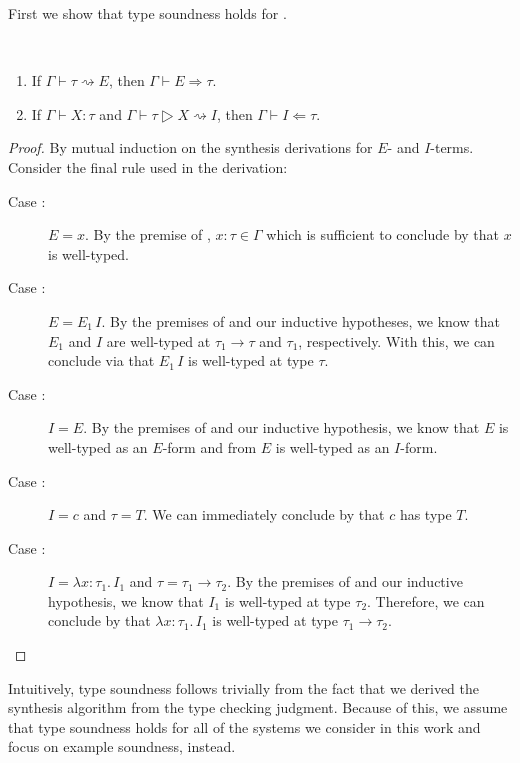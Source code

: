 First we show that type soundness holds for \lsyn{}.
\begin{proofenv}
  \begin{lemma}\ %
    \begin{enumerate}
      \item If $Γ ⊢ τ ⇝ E$, then $Γ ⊢ E ⇒ τ$.
      \item If $Γ ⊢ Χ : τ$ and $Γ ⊢ τ ▷ Χ ⇝ I$, then $Γ ⊢ I ⇐ τ$.
    \end{enumerate}
  \end{lemma}
  \begin{proof}
    By mutual induction on the synthesis derivations for $E$- and $I$-terms.
    Consider the final rule used in the derivation:
    \begin{description}
      \item[Case :]
        $E = x$.
        By the premise of , $x{:}τ ∈ Γ$ which is sufficient to conclude by  that $x$ is well-typed.
      \item[Case :]
        $E = E_1\,I$.
        By the premises of  and our inductive hypotheses, we know that $E_1$ and $I$ are well-typed at $τ_1 → τ$ and $τ_1$, respectively.
        With this, we can conclude via  that $E_1\,I$ is well-typed at type $τ$.
      \item[Case :]
        $I = E$.
        By the premises of  and our inductive hypothesis, we know that $E$ is well-typed as an $E$-form and from  $E$ is well-typed as an $I$-form.
      \item[Case :]
        $I = c$ and $τ = T$.
        We can immediately conclude by  that $c$ has type $T$.
      \item[Case :]
        $I = λx{:}τ_1.\,I_1$ and $τ = τ_1 → τ_2$.
        By the premises of  and our inductive hypothesis, we know that $I_1$ is well-typed at type $τ_2$.
        Therefore, we can conclude by  that $λx{:}τ_1.\,I_1$ is well-typed at type $τ_1 → τ_2$.
    \end{description}
  \end{proof}
\end{proofenv}
Intuitively, type soundness follows trivially from the fact that we derived the synthesis algorithm from the type checking judgment.
Because of this, we assume that type soundness holds for all of the systems we consider in this work and focus on example soundness, instead.

